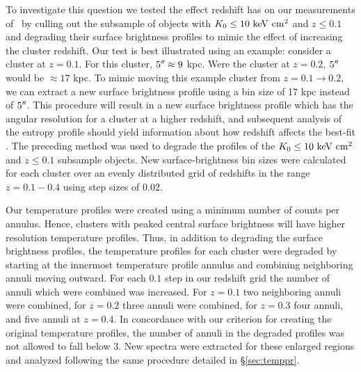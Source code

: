 \documentclass[12pt,preprint]{aastex}
\begin{document}
To investigate this question we tested the effect redshift has on our
measurements of \kna\ by culling out the subsample of objects with
$K_0 \leq 10 \mathrm{\mbox{\ensuremath{\mathrm{~keV}}} \mathrm{\mbox{\ensuremath{\mathrm{~cm}}}^2}}$ and $z \leq 0.1$ and degrading their surface
brightness profiles to mimic the effect of increasing the cluster
redshift. Our test is best illustrated using an example: consider a
cluster at $z = 0.1$. For this cluster, $5\mathrm{^\prime}\hskip -0.1em\mathrm{^\prime} \approx 9$ kpc. Were
the cluster at $z = 0.2$, $5\mathrm{^\prime}\hskip -0.1em\mathrm{^\prime}$ would be $\approx 17$ kpc. To mimic
moving this example cluster from $z = 0.1 \rightarrow 0.2$, we can
extract a new surface brightness profile using a bin size of 17 kpc
instead of $5\mathrm{^\prime}\hskip -0.1em\mathrm{^\prime}$. This procedure will result in a new surface
brightness profile which has the angular resolution for a cluster at a
higher redshift, and subsequent analysis of the entropy profile should
yield information about how redshift affects the best-fit \kna. The
preceding method was used to degrade the profiles of the $K_0 \leq 10
\mathrm{\mbox{\ensuremath{\mathrm{~keV}}} \mathrm{\mbox{\ensuremath{\mathrm{~cm}}}^2}}$ and $z \leq 0.1$ subsample objects. New surface-brightness bin
sizes were calculated for each cluster over an evenly distributed grid
of redshifts in the range $z = 0.1-0.4$ using step sizes of 0.02.

Our temperature profiles were created using a minimum number of counts
per annulus. Hence, clusters with peaked central surface brightness
will have higher resolution temperature profiles. Thus, in addition to
degrading the surface brightness profiles, the temperature profiles
for each cluster were degraded by starting at the innermost
temperature profile annulus and combining neighboring annuli moving
outward. For each $0.1$ step in our redshift grid the number of annuli
which were combined was increased. For $z=0.1$ two neighboring annuli
were combined, for $z=0.2$ three annuli were combined, for $z=0.3$
four annuli, and five annuli at $z=0.4$. In concordance with our
criterion for creating the original temperature profiles, the number
of annuli in the degraded profiles was not allowed to fall below
3. New spectra were extracted for these enlarged regions and analyzed
following the same procedure detailed in \S\ref{sec:temppr}.
\end{document}
